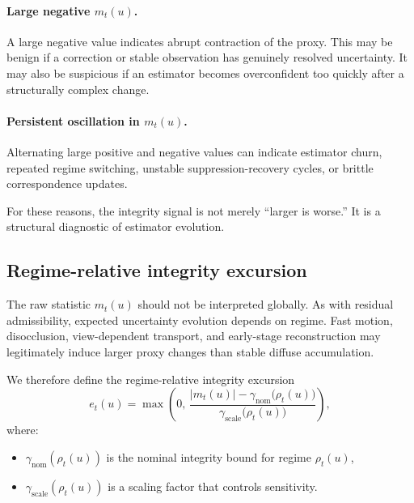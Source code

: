 \documentclass[11pt,letterpaper]{article}
\theoremstyle{gcresult}
\theoremstyle{definition}
\begin{document}
\paragraph{Large negative $m_t(u)$.}
A large negative value indicates abrupt contraction of the proxy. This may be benign if a correction or stable observation has genuinely resolved uncertainty. It may also be suspicious if an estimator becomes overconfident too quickly after a structurally complex change.

\paragraph{Persistent oscillation in $m_t(u)$.}
Alternating large positive and negative values can indicate estimator churn, repeated regime switching, unstable suppression-recovery cycles, or brittle correspondence updates.

For these reasons, the integrity signal is not merely “larger is worse.” It is a structural diagnostic of estimator evolution.


\subsection{Regime-relative integrity excursion}

The raw statistic $m_t(u)$ should not be interpreted globally. As with residual admissibility, expected uncertainty evolution depends on regime. Fast motion, disocclusion, view-dependent transport, and early-stage reconstruction may legitimately induce larger proxy changes than stable diffuse accumulation.

We therefore define the regime-relative integrity excursion
\begin{equation}
e_t(u)=
\max\!\left(
0,\,
\frac{|m_t(u)|-\gamma_{\mathrm{nom}}\bigl(\rho_t(u)\bigr)}
{\gamma_{\mathrm{scale}}\bigl(\rho_t(u)\bigr)}
\right),
\end{equation}
where:
\begin{itemize}[leftmargin=1.5em]
    \item $\gamma_{\mathrm{nom}}(\rho_t(u))$ is the nominal integrity bound for regime $\rho_t(u)$,
    \item $\gamma_{\mathrm{scale}}(\rho_t(u))$ is a scaling factor that controls sensitivity.
\end{itemize}
\end{document}
